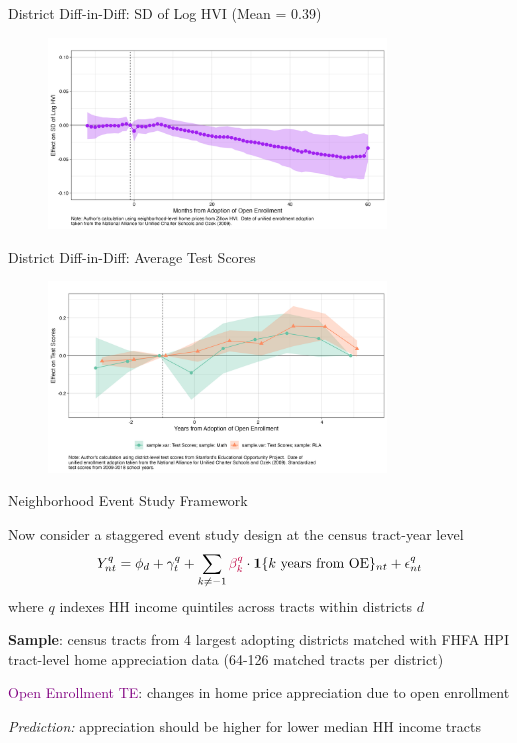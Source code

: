 \documentclass[notes,11pt, aspectratio=169]{beamer}
\newenvironment{wideitemize}{\itemize\addtolength{\itemsep}{10pt}}{\enditemize}
\begin{document}
\begin{frame}{District Diff-in-Diff: SD of Log HVI (Mean = 0.39)}
\label{sd}
\begin{figure}
\centering
\includegraphics[width=0.8\textwidth]{figures/event_study_sd.png}
\end{figure}
\hyperlink{gini_did}{}
\end{frame}

\begin{frame}{District Diff-in-Diff: Average Test Scores}
\begin{figure}
\centering
\includegraphics[width=0.8\textwidth]{figures/did_scores.png}
\end{figure}
\end{frame}

\begin{frame}{Neighborhood Event Study Framework}
\begin{wideitemize}
\item Now consider a staggered event study design at the census tract-year level\[Y_{nt}^q = \phi_d + \gamma_t^q + \sum_{k \ne -1 } \textcolor{purple}{\beta_k^q} \cdot \mathbf{1}\{\text{$k$ years from OE}\}_{nt} +  \epsilon_{nt}^q \]
where $q$ indexes HH income quintiles across tracts within districts $d$
\item \textbf{Sample}: census tracts from 4 largest adopting districts matched with FHFA HPI tract-level home appreciation data (64-126 matched tracts per district)
\item \textcolor{purple}{Open Enrollment TE}: changes in home price appreciation due to open enrollment
\item \textit{Prediction:} appreciation should be higher for lower median HH income tracts
\end{wideitemize}
\end{frame}
\end{document}
